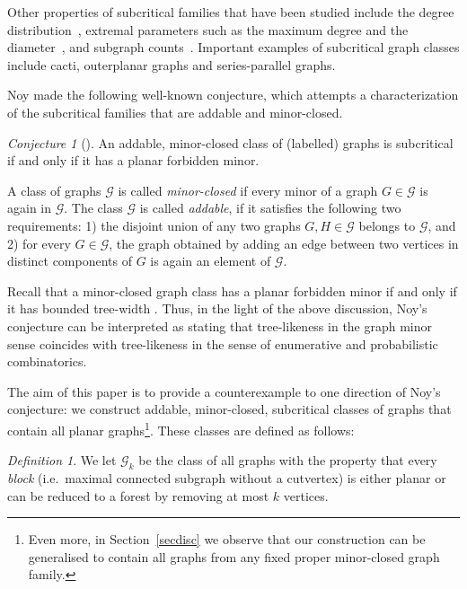 \documentclass[a4paper]{article}
\newcommand{\G}{\mathcal{G}}
\theoremstyle{remark}
\newtheorem{definition}{Definition}
\newtheorem{conjecture}{{Conjecture}}[section]
\begin{document}
Other properties of subcritical families that have been studied include the degree distribution~\cite{BePaStDeg}, extremal parameters such as the maximum degree and the diameter~\cite{drmota13}, and subgraph counts~\cite{DrmRamRue}. 
Important examples of subcritical graph classes include cacti, outerplanar graphs and series-parallel graphs.

Noy  \cite{Noy2014random} made the following well-known conjecture, which attempts a characterization of the subcritical families that are addable and minor-closed.

\begin{conjecture}[\cite{Noy2014random}]
An addable, minor-closed class of (labelled) graphs is subcritical if and only if it has a planar forbidden minor.
\end{conjecture}

A class of graphs $\mathcal{G}$ is called {\em minor-closed} if every minor of a graph $G \in \mathcal{G}$ is again in $\mathcal{G}$. The class $\mathcal{G}$ is called {\em addable}, if it satisfies the following two requirements: 1) the disjoint union of any two graphs $G,H \in \mathcal{G}$ belongs to $\mathcal{G}$, and 2) for every $G \in \mathcal{G}$, the graph obtained by adding an edge between two vertices in distinct  components of $G$ is again an element of $\mathcal{G}$.

Recall that a minor-closed graph class has a planar forbidden minor if and only if it has bounded tree-width \cite{GMV}. Thus, in the light of the above discussion, Noy's conjecture can be interpreted as stating that tree-likeness in the graph minor sense coincides with tree-likeness in the sense of enumerative and probabilistic combinatorics.

The aim of this paper is to provide a counterexample to one direction of Noy's conjecture: we construct addable, minor-closed,  subcritical classes of graphs that contain all planar graphs\footnote{Even more, in Section~\ref{secdisc} we observe that our construction can be generalised to contain all graphs from any fixed proper minor-closed graph family.}. These classes are defined as follows:

\begin{definition}\label{ref:Gkdefi}
We let $\G_k$ be the class of all graphs with the property that every {\em block} (i.e.\ maximal connected subgraph without a cutvertex) is either planar or can be reduced to a forest by removing at most $k$ vertices.
\end{definition}
\end{document}
